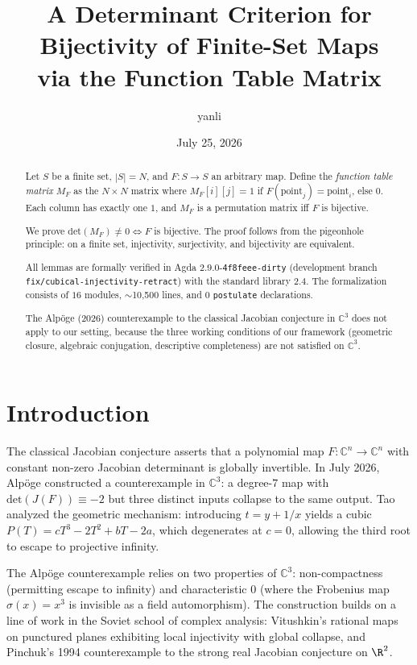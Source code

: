 \documentclass[a4paper,11pt]{article}
\title{A Determinant Criterion for Bijectivity of Finite-Set Maps\\
via the Function Table Matrix}
\author{yanli}
\date{July 25, 2026}
\theoremstyle{definition}
\theoremstyle{remark}
\newcommand{\C}{\mathbb{C}}
\newcommand{\MF}{M_F}
\newcommand{\Det}{\mathrm{det}}
\newcommand{\Jac}{J(F)}
\newcommand{\Frob}{\sigma}
\begin{document}
\maketitle

\begin{abstract}
Let $S$ be a finite set, $|S|=N$, and $F:S\to S$ an arbitrary map.
Define the {\em function table matrix} $\MF$ as the $N\times N$ matrix
where $\MF[i][j]=1$ if $F(\text{point}_j)=\text{point}_i$, else $0$.
Each column has exactly one $1$, and $\MF$ is a permutation matrix iff $F$ is bijective.

We prove $\Det(\MF)\neq 0\iff F$ is bijective.
The proof follows from the pigeonhole principle: on a finite set, injectivity,
surjectivity, and bijectivity are equivalent.

All lemmas are formally verified in Agda $2.9.0$-\texttt{4f8feee-dirty}
(development branch \texttt{fix/cubical-injectivity-retract}) with the
standard library $2.4$. The formalization consists of $16$ modules,
$\sim$10,500 lines, and $0$ \texttt{postulate} declarations.

The Alp\"{o}ge (2026) counterexample to the classical Jacobian conjecture
in $\C^3$ does not apply to our setting, because the three working conditions
of our framework (geometric closure, algebraic conjugation, descriptive completeness)
are not satisfied on $\C^3$.
\end{abstract}

\section{Introduction}

The classical Jacobian conjecture \cite{keller} asserts that a polynomial map
$F:\C^n\to\C^n$ with constant non-zero Jacobian determinant is globally invertible.
In July 2026, Alp\"{o}ge \cite{alpoge} constructed a counterexample in $\C^3$:
a degree-$7$ map with $\Det(\Jac)\equiv-2$ but three distinct inputs collapse to
the same output. Tao \cite{tao} analyzed the geometric mechanism: introducing
$t=y+1/x$ yields a cubic $P(T)=cT^3-2T^2+bT-2a$, which degenerates at $c=0$,
allowing the third root to escape to projective infinity.

The Alp\"{o}ge counterexample relies on two properties of $\C^3$:
non-compactness (permitting escape to infinity) and characteristic $0$
(where the Frobenius map $\Frob(x)=x^3$ is invisible as a field automorphism).
The construction builds on a line of work in the Soviet school of
complex analysis: Vitushkin's rational maps on punctured planes exhibiting
local injectivity with global collapse, and Pinchuk's \cite{pinchuk} 1994
counterexample to the strong real Jacobian conjecture on $\R^2$.
\end{document}
